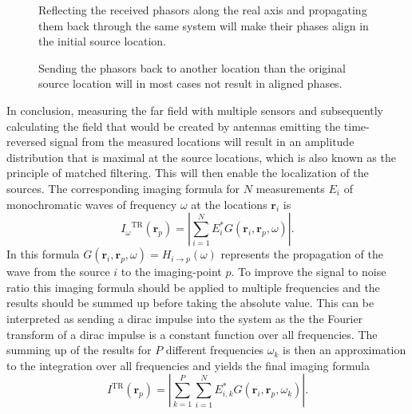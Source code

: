 \begin{figure}
    \centering
    \def\svgwidth{0.8\textwidth}
    
    \caption{Reflecting the received phasors along the real axis and propagating them back through the same system will make their phases align in the initial source location.}\label{fig:constructive_backpropagation}
\end{figure}

\begin{figure}
    \centering
    \def\svgwidth{0.8\textwidth}
    
    \caption{Sending the phasors back to another location than the original source location will in most cases not result in aligned phases.}\label{fig:destructive_backpropagation}
\end{figure}

In conclusion, measuring the far field with multiple sensors and subsequently calculating the field that would be created by antennas emitting the time-reversed signal from the measured locations will result in an amplitude distribution that is maximal at the source locations, which is also known as the principle of matched filtering.
This will then enable the localization of the sources. 
The corresponding imaging formula for \(N\) measurements \(E_i\) of monochromatic waves of frequency \(\omega \) at the locations \(\bm{r}_i\) is~\parencite{peng_zhang_comparison_2013}
\begin{equation}
    {I_{\omega}}^{\mathrm{\text{TR}}}\left(\bm{r}_p\right)=|\sum_{i=1}^N E_{i}^* G\left(\bm{r}_i, \bm{r}_p, \omega\right)|.
\end{equation}
In this formula \(G(\bm{r}_i, \bm{r}_p, \omega) = H_{i\rightarrow p}(\omega)\) represents the propagation of the wave from the source \(i\) to the imaging-point \(p\).
To improve the signal to noise ratio this imaging formula should be applied to multiple frequencies and the results should be summed up before taking the absolute value.
This can be interpreted as sending a dirac impulse into the system as the the Fourier transform of a dirac impulse is a constant function over all frequencies.
The summing up of the results for \(P\) different frequencies \(\omega_k\) is then an approximation to the integration over all frequencies and yields the final imaging formula
\begin{equation}
    I^{\mathrm{\text{TR}}}\left(\bm{r}_p\right)=|\sum_{k=1}^P \sum_{i=1}^N E_{i, k}^* G\left(\bm{r}_i, \bm{r}_p, \omega_k\right)|.
\end{equation}


